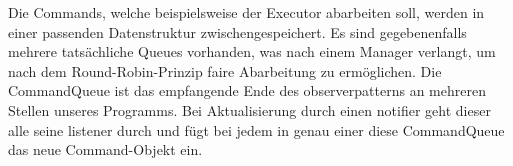       \medskip
      Die Commands, welche beispielsweise der Executor abarbeiten soll, werden in
      einer passenden Datenstruktur zwischengespeichert. Es sind gegebenenfalls mehrere
      tatsächliche Queues vorhanden, was nach einem Manager verlangt, um nach dem
      Round-Robin-Prinzip faire Abarbeitung zu ermöglichen. Die CommandQueue
      ist das empfangende Ende des \gls{observerpattern}s an mehreren Stellen unseres
      Programms. Bei Aktualisierung durch einen \gls{notifier} geht dieser alle
      seine \gls{listener} durch und fügt bei jedem in genau einer diese
      CommandQueue das neue Command-Objekt ein.